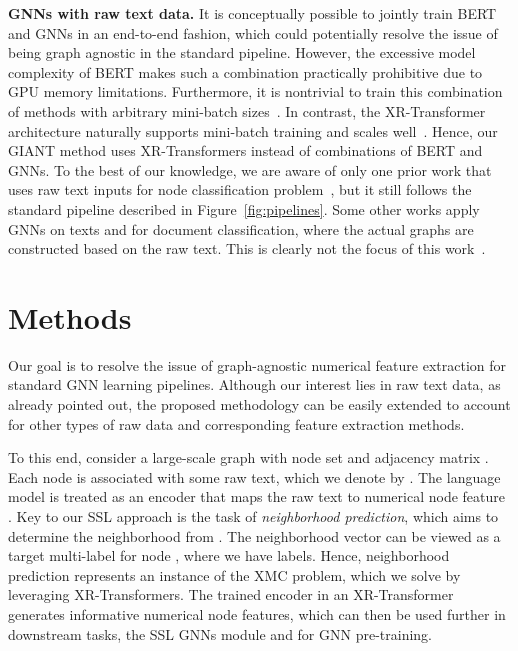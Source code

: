 \documentclass{article} \usepackage{iclr2022_conference,times}
\begin{document}
\textbf{GNNs with raw text data. }
It is conceptually possible to jointly train BERT and GNNs in an end-to-end fashion, which could potentially resolve the issue of being graph agnostic in the standard pipeline. However, the excessive model complexity of BERT makes such a combination practically prohibitive due to GPU memory limitations. Furthermore, it is nontrivial to train this combination of methods with arbitrary mini-batch sizes~\citep{chiang2019cluster,graphsaint-iclr20}. In contrast, the XR-Transformer architecture naturally supports mini-batch training and scales well~\citep{jiang2021lightxml}. Hence, our GIANT method uses XR-Transformers instead of combinations of BERT and GNNs. To the best of our knowledge, we are aware of only one prior work that uses raw text inputs for node classification problem~\citep{zhang2020graph}, but it still follows the standard pipeline described in Figure~\ref{fig:pipelines}. Some other works apply GNNs on texts and for document classification, where the actual graphs are constructed based on the raw text. This is clearly not the focus of this work~\citep{yao2019graph,huang2019text,zhang2020text,liu2020tensor}.

\vspace{-0.3cm}
\section{Methods}\label{sec:method}
Our goal is to resolve the issue of graph-agnostic numerical feature extraction for standard GNN learning pipelines. Although our interest lies in raw text data, as already pointed out, the proposed methodology can be easily extended to account for other types of raw data and corresponding feature extraction methods. 


To this end, consider a large-scale graph  with node set  and adjacency matrix . Each node  is associated with some raw text, which we denote by . The language model is treated as an encoder  that maps the raw text  to numerical node feature . Key to our SSL approach is the task of \emph{neighborhood prediction}, which aims to determine the neighborhood  from . The neighborhood vector  can be viewed as a target multi-label  for node , where we have  labels. Hence, neighborhood prediction represents an instance of the XMC problem, which we solve by leveraging XR-Transformers. The trained encoder in an XR-Transformer generates informative numerical node features, which can then be used further in downstream tasks, the SSL GNNs module and for GNN pre-training. 
\end{document}
